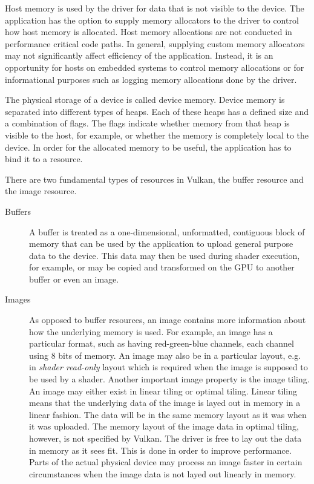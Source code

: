    Host memory is used by the \gls{driver} for data that is not visible to the device. The \gls{application} has the option to supply memory allocators to the \gls{driver} to control how \gls{host} memory is allocated. Host memory allocations are not conducted in performance critical code paths. In general, supplying custom memory allocators may not significantly affect efficiency of the \gls{application}. Instead, it is an opportunity for \glspl{host} on embedded systems to control memory allocations or for informational purposes such as logging memory allocations done by the \gls{driver}.

    The physical storage of a device is called device memory. Device memory is separated into different types of heaps. Each of these heaps has a defined size and a combination of flags. The flags indicate whether memory from that heap is visible to the \gls{host}, for example, or whether the memory is completely local to the device. In order for the allocated memory to be useful, the \gls{application} has to bind it to a resource.

    There are two fundamental types of resources in Vulkan, the buffer resource and the image resource.

    \begin{description}
      \item[Buffers]
        A buffer is treated as a one-dimensional, unformatted, contiguous block of memory that can be used by the \gls{application} to upload general purpose data to the device. This data may then be used during shader execution, for example, or may be copied and transformed on the GPU to another buffer or even an image.

      \item[Images]
        As opposed to buffer resources, an image contains more information about how the underlying memory is used. For example, an image has a particular format, such as having red-green-blue channels, each channel using 8 bits of memory. An image may also be in a particular layout, e.g. in \textit{shader read-only} layout which is required when the image is supposed to be used by a shader. Another important image property is the image tiling. An image may either exist in linear tiling or optimal tiling. Linear tiling means that the underlying data of the image is layed out in memory in a linear fashion. The data will be in the same memory layout as it was when it was uploaded. The memory layout of the image data in optimal tiling, however, is not specified by Vulkan. The \gls{driver} is free to lay out the data in memory as it sees fit. This is done in order to improve performance. Parts of the actual physical device may process an image faster in certain circumstances when the image data is not layed out linearly in memory.
    \end{description}

